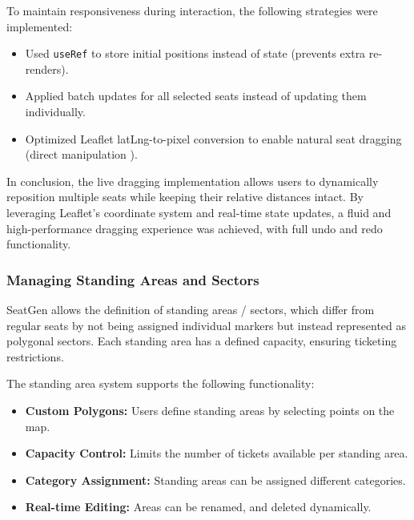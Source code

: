 To maintain responsiveness during interaction, the following strategies were implemented:
\begin{itemize}
    \item Used \texttt{useRef} to store initial positions instead of state (prevents extra re-renders).
    \item Applied batch updates for all selected seats instead of updating them individually.
    \item Optimized Leaflet latLng-to-pixel conversion to enable natural seat dragging (direct manipulation \cite{Hutchins01121985}).
\end{itemize}

In conclusion, the live dragging implementation allows users to dynamically reposition multiple seats while keeping their relative distances intact. By leveraging Leaflet’s coordinate system and real-time state updates, a fluid and high-performance dragging experience was achieved, with full undo and redo functionality.

\subsubsection{Managing Standing Areas and Sectors}

SeatGen allows the definition of standing areas / sectors, which differ from regular seats by not being assigned individual markers but instead represented as polygonal sectors. Each standing area has a defined capacity, ensuring ticketing restrictions.

The standing area system supports the following functionality:
\begin{itemize}
    \item \textbf{Custom Polygons:} Users define standing areas by selecting points on the map.
    \item \textbf{Capacity Control:} Limits the number of tickets available per standing area.
    \item \textbf{Category Assignment:} Standing areas can be assigned different categories.
    \item \textbf{Real-time Editing:} Areas can be renamed, and deleted dynamically.
\end{itemize}

